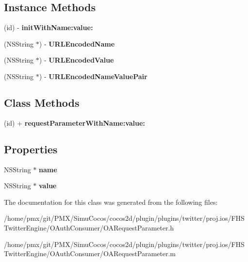 \subsection*{Instance Methods}
\begin{DoxyCompactItemize}
\item 
\mbox{\label{interfaceOARequestParameter_a72db384c5099519f5333625d00d1c8a8}} 
(id) -\/ {\bfseries init\+With\+Name\+:value\+:}
\item 
\mbox{\label{interfaceOARequestParameter_af9066b1a1bda750974ca881f933c5883}} 
(N\+S\+String $\ast$) -\/ {\bfseries U\+R\+L\+Encoded\+Name}
\item 
\mbox{\label{interfaceOARequestParameter_ac6364dc825daaa9927a61baf38007678}} 
(N\+S\+String $\ast$) -\/ {\bfseries U\+R\+L\+Encoded\+Value}
\item 
\mbox{\label{interfaceOARequestParameter_af355e0ae6b5d3b3c4d098754d350e29f}} 
(N\+S\+String $\ast$) -\/ {\bfseries U\+R\+L\+Encoded\+Name\+Value\+Pair}
\end{DoxyCompactItemize}
\subsection*{Class Methods}
\begin{DoxyCompactItemize}
\item 
\mbox{\label{interfaceOARequestParameter_aeea2e3a4ca5faf62ae0c09eb045fc959}} 
(id) + {\bfseries request\+Parameter\+With\+Name\+:value\+:}
\end{DoxyCompactItemize}
\subsection*{Properties}
\begin{DoxyCompactItemize}
\item 
\mbox{\label{interfaceOARequestParameter_a6d3ced0c4a1bbae4b1cec0543dd082ff}} 
N\+S\+String $\ast$ {\bfseries name}
\item 
\mbox{\label{interfaceOARequestParameter_a864a67d873df54ebe9962687966d2055}} 
N\+S\+String $\ast$ {\bfseries value}
\end{DoxyCompactItemize}


The documentation for this class was generated from the following files\+:\begin{DoxyCompactItemize}
\item 
/home/pmx/git/\+P\+M\+X/\+Simu\+Cocos/cocos2d/plugin/plugins/twitter/proj.\+ios/\+F\+H\+S\+Twitter\+Engine/\+O\+Auth\+Consumer/O\+A\+Request\+Parameter.\+h\item 
/home/pmx/git/\+P\+M\+X/\+Simu\+Cocos/cocos2d/plugin/plugins/twitter/proj.\+ios/\+F\+H\+S\+Twitter\+Engine/\+O\+Auth\+Consumer/O\+A\+Request\+Parameter.\+m\end{DoxyCompactItemize}
